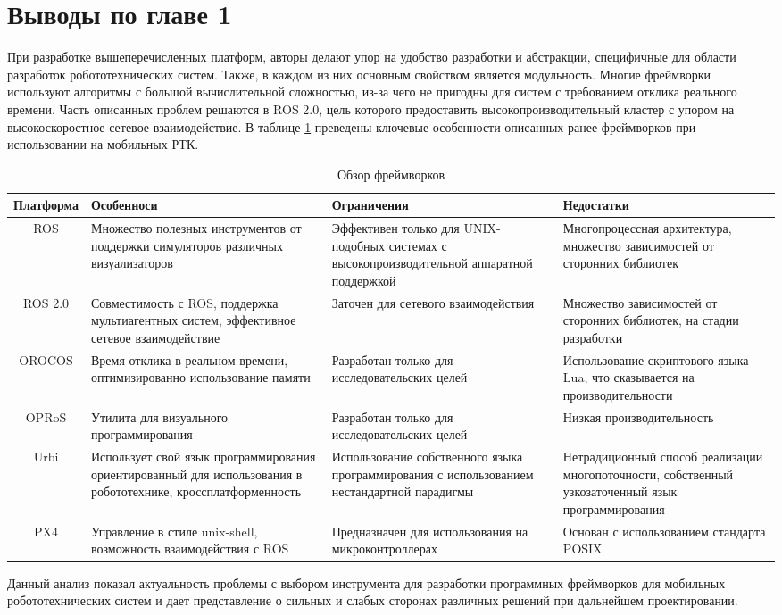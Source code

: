 \section*{Выводы по главе 1}

При разработке вышеперечисленных платформ, авторы делают упор на удобство 
разработки и абстракции, специфичные для области разработок робототехнических 
систем. Также, в каждом из них основным свойством является модульность. Многие 
фреймворки используют алгоритмы с большой вычислительной сложностью, из-за чего 
не пригодны для систем с требованием отклика реального времени. Часть описанных 
проблем решаются в ROS 2.0, цель которого предоставить высокопроизводительный 
кластер с упором на высокоскоростное сетевое взаимодействие. В таблице 
\ref{tab:frameworks} преведены ключевые особенности описанных ранее фреймворков 
при использовании на мобильных РТК.

\begin{table}
    \caption{\label{tab:frameworks}Обзор фреймворков}
    \begin{center}
        \begin{tabularx}{\textwidth}{|c|X|X|X|}
            \hline
            Платформа & Особенноси & Ограничения & Недостатки \\
            \hline
            ROS & Множество полезных инструментов от поддержки симуляторов различных визуализаторов & Эффективен только для UNIX-подобных системах с высокопроизводительной аппаратной поддержкой & Многопроцессная архитектура, множество зависимостей от сторонних библиотек \\
            \hline
            ROS 2.0 & Совместимость с ROS, поддержка мультиагентных систем, эффективное сетевое взаимодействие & Заточен для сетевого взаимодействия & Множество зависимостей от сторонних библиотек, на стадии разработки \\
            \hline
            OROCOS & Время отклика в реальном времени, оптимизированно использование памяти & Разработан только для исследовательских целей & Использование скриптового языка Lua, что сказывается на производительности \\
            \hline
            OPRoS & Утилита для визуального программирования & Разработан только для исследовательских целей & Низкая производительность \\
            \hline
            Urbi & Использует свой язык программирования ориентированный для использования в робототехнике, кроссплатформенность & Использование собственного языка программирования с использованием нестандартной парадигмы & Нетрадиционный способ реализации многопоточности, собственный узкозаточенный язык программирования \\
            \hline
            PX4 & Управление в стиле unix-shell, возможность взаимодействия с ROS & Предназначен для использования на микроконтроллерах & Основан с использованием стандарта POSIX \\
            \hline
        \end{tabularx}
    \end{center}
\end{table}

Данный анализ показал актуальность проблемы с выбором инструмента для разработки программных фреймворков для мобильных робототехнических систем и дает представление о сильных и слабых сторонах различных решений при дальнейшем проектировании. 